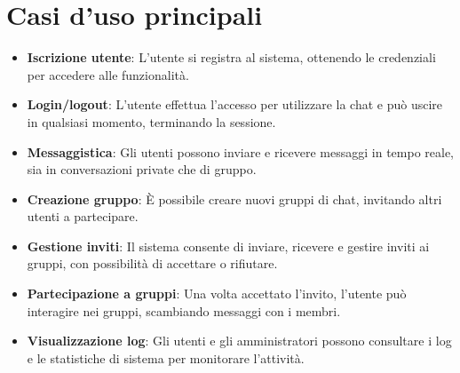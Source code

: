 \section{Casi d'uso principali}
\begin{itemize}
	\item \textbf{Iscrizione utente}: L'utente si registra al sistema, ottenendo le credenziali per accedere alle funzionalità.
	\item \textbf{Login/logout}: L'utente effettua l'accesso per utilizzare la chat e può uscire in qualsiasi momento, terminando la sessione.
	\item \textbf{Messaggistica}: Gli utenti possono inviare e ricevere messaggi in tempo reale, sia in conversazioni private che di gruppo.
	\item \textbf{Creazione gruppo}: È possibile creare nuovi gruppi di chat, invitando altri utenti a partecipare.
	\item \textbf{Gestione inviti}: Il sistema consente di inviare, ricevere e gestire inviti ai gruppi, con possibilità di accettare o rifiutare.
	\item \textbf{Partecipazione a gruppi}: Una volta accettato l'invito, l'utente può interagire nei gruppi, scambiando messaggi con i membri.
	\item \textbf{Visualizzazione log}: Gli utenti e gli amministratori possono consultare i log e le statistiche di sistema per monitorare l'attività.
\end{itemize}